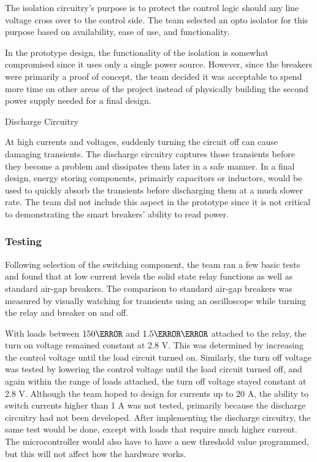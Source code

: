 The isolation circuitry's purpose is to protect the control logic should any line voltage cross over to the control side. The team selected an opto isolator for this purpose based on availability, ease of use, and functionality. 

In the prototype design, the functionality of the isolation is somewhat compromised since it uses only a single power source. However, since the breakers were primarily a proof of concept, the team decided it was acceptable to spend more time on other areas of the project instead of physically building the second power supply needed for a final design.   

Discharge Circuitry

At high currents and voltages, suddenly turning the circuit off can cause damaging transients. The discharge circuitry captures those transients before they become a problem and dissipates them later in a safe manner. In a final design, energy storing components, primairly capacitors or inductors, would be used to quickly absorb the transients before discharging them at a much slower rate. The team did not include this aspect in the prototype since it is not critical to demonstrating the smart breakers' ability to read power.

\subsubsection{Testing}
Following selection of the switching component, the team ran a few basic tests and found that at low current levels the solid state relay functions as well as standard air-gap breakers. The comparison to standard air-gap breakers was measured by visually watching for transients using an oscilloscope while turning the relay and breaker on and off. 

With loads between $150 \ohm$ and $1.5\kilo\ohm$ attached to the relay, the turn on voltage remained constant at 2.8 V. This was determined by increasing the control voltage until the load circuit turned on. Similarly, the turn off voltage was tested by lowering the control voltage until the load circuit turned off, and again within the range of loads attached, the turn off voltage stayed constant at 2.8 V. Although the team hoped to design for currents up to 20 A, the ability to switch currents higher than 1 A was not tested, primarily because the discharge circuitry had not been developed. After implementing the discharge circuitry, the same test would be done, except with loads that require much higher current. The microcontroller would also have to have a new threshold value programmed, but this will not affect how the hardware works.

